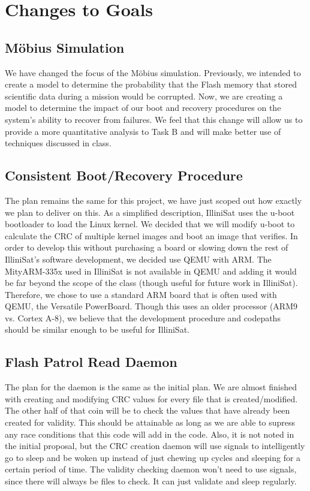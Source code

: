 \section{Changes to Goals} 

\subsection{M\"obius Simulation}
We have changed the focus of the M\"obius simulation.  Previously, we intended to create a model to determine the probability that the Flash memory that stored scientific data during a mission would be corrupted.  Now, we are creating a model to determine the impact of our boot and recovery procedures on the system's ability to recover from failures.  We feel that this change will allow us to provide a more quantitative analysis to Task B and will make better use of techniques discussed in class.

\subsection{Consistent Boot/Recovery Procedure}
The plan remains the same for this project, we have just scoped out how exactly
we plan to deliver on this. As a simplified description, IlliniSat uses the
u-boot bootloader to load the Linux kernel.  We decided that we will modify
u-boot to calculate the CRC of multiple kernel images and boot an image that
verifies.  In order to develop this without purchasing a board or slowing down
the rest of IlliniSat's software development, we decided use QEMU with ARM. The
MityARM-335x used in IlliniSat is not available in QEMU and adding it would be
far beyond the scope of the class (though useful for future work in IlliniSat).
Therefore, we chose to use a standard ARM board that is often used with QEMU,
the Versatile PowerBoard.  Though this uses an older processor (ARM9 vs. Cortex
A-8), we believe that the development procedure and codepaths should be similar
enough to be useful for IlliniSat.


\subsection{Flash Patrol Read Daemon}
The plan for the daemon is the same as the initial plan. We are almost finished
with creating and modifying CRC values for every file that is created/modified. 
The other half of that coin will be to check the values that have already been
created for validity. This should be attainable as long as we are able to 
supress any race conditions that this code will add in the code. Also, it is
not noted in the initial proposal, but the CRC creation daemon will use signals 
to intelligently go to sleep and be woken up instead of just chewing up cycles 
and sleeping for a certain period of time. The validity checking daemon won't need
to use signals, since there will always be files to check. It can just validate and sleep
regularly.
